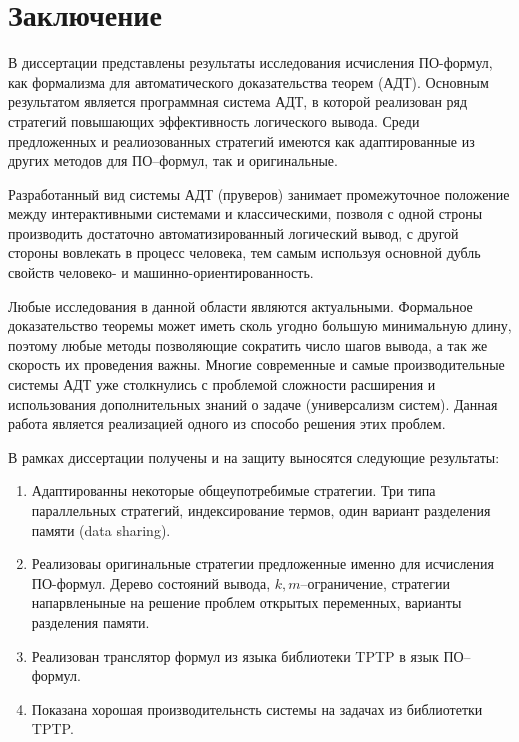 \chapter*{Заключение}

В диссертации представлены результаты исследования исчисления ПО-формул, как формализма для автоматического доказательства теорем (АДТ). Основным результатом является программная система АДТ, в которой реализован ряд стратегий повышающих эффективность логического вывода. Среди предложенных и реалиозованных стратегий имеются как адаптированные из других методов для ПО--формул, так и оригинальные. 

Разработанный вид системы АДТ (пруверов) занимает промежуточное положение между интерактивными системами и классическими, позволя с одной строны производить достаточно автоматизированный логический вывод, с другой стороны вовлекать в процесс человека, тем самым используя основной дубль свойств человеко- и машинно-ориентированность.

Любые исследования в данной области являются актуальными. Формальное доказательство теоремы может иметь сколь угодно большую минимальную длину, поэтому любые методы позволяющие сократить число шагов вывода, а так же скорость их проведения важны. Многие современные и самые производительные системы АДТ уже столкнулись с проблемой сложности расширения и использования дополнительных знаний о задаче (универсализм систем). Данная работа является реализацией одного из способо решения этих проблем.


В рамках диссертации получены и на защиту выносятся следующие результаты:
\begin{enumerate}
\item Адаптированны некоторые общеупотребимые стратегии. Три типа параллельных стратегий, индексирование термов, один вариант разделения памяти (data sharing).
\item Реализоваы оригинальные стратегии предложенные именно для исчисления ПО-формул. Дерево состояний вывода, $k,m$--ограничение, стратегии напарвленыные на решение проблем открытых переменных, варианты разделения памяти.
\item Реализован транслятор формул из языка библиотеки TPTP в язык ПО--формул.
\item Показана хорошая производительнсть системы на задачах из библиотетки TPTP.
\end{enumerate}

